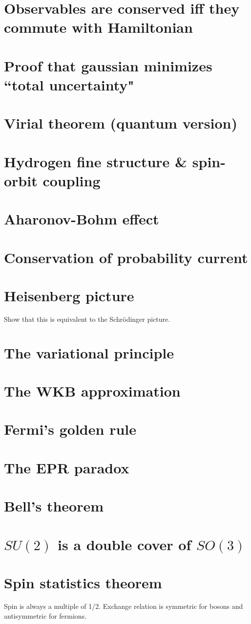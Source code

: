\documentclass[12pt]{article}
\begin{document}
\section{Observables are conserved iff they commute with Hamiltonian}

\section{Proof that gaussian minimizes ``total uncertainty"}

\section{Virial theorem (quantum version)}

\section{Hydrogen fine structure \& spin-orbit coupling}

\section{Aharonov-Bohm effect}

\section{Conservation of probability current}

\section{Heisenberg picture}
Show that this is equivalent to the Schrödinger picture.

\section{The variational principle}

\section{The WKB approximation}

\section{Fermi's golden rule}

\section{The EPR paradox}

\section{Bell's theorem}

\section{$SU(2)$ is a double cover of $SO(3)$}

\section{Spin statistics theorem}
Spin is always a multiple of 1/2. Exchange relation is symmetric for bosons and antisymmetric for fermions.
\end{document}
